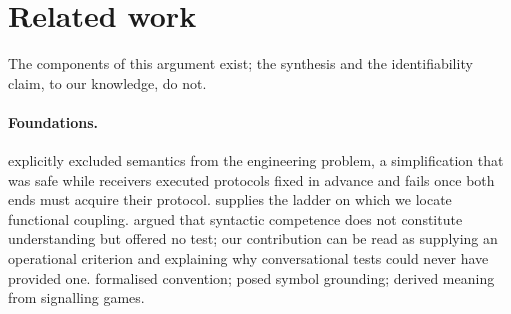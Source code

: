 \documentclass[11pt,a4paper]{article}
\theoremstyle{plain}
\theoremstyle{definition}
\theoremstyle{remark}
\begin{document}
\section{Related work}\label{sec:related}

The components of this argument exist; the synthesis and the identifiability claim, to our knowledge, do not.

\paragraph{Foundations.}
\citet{shannon1948mathematical} explicitly excluded semantics from the engineering problem, a simplification
that was safe while receivers executed protocols fixed in advance and fails once both ends must acquire their
protocol. \citet{pearl2009causality} supplies the ladder on which we locate functional coupling.
\citet{searle1980minds} argued that syntactic competence does not constitute understanding but offered no
test; our contribution can be read as supplying an operational criterion and explaining why conversational
tests could never have provided one. \citet{lewis1969convention} formalised convention;
\citet{harnad1990symbol} posed symbol grounding; \citet{skyrms2010signals} derived meaning from signalling
games.
\end{document}
